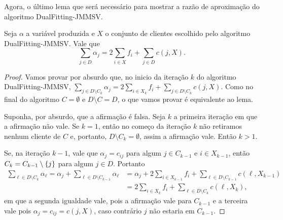 Agora, o último lema que será necessário para mostrar a razão de aproximação do algoritmo {\sc DualFitting-JMMSV}.

\begin{lemma}
\label{greedy:5}
Seja $\alpha$ a variável produzida e $X$ o conjunto de clientes escolhido pelo algoritmo {\sc DualFitting-JMMSV}. Vale que 
\[ \sum_{j \in D} \alpha_j =  2\sum_{i \in X} f_i + \sum_{j \in D} c(j,X) .
\]
\end{lemma}

\begin{proof}
Vamos provar por absurdo que, no inicio da iteração $k$ do algoritmo {\sc DualFitting-JMMSV}, $\sum_{j \in D \setminus C_k} \alpha_j = 2 \sum_{i \in X_k} f_i + \sum_{j \in D \setminus C_k} c(j,X) $. Como no final do algoritmo $C = \emptyset$ e $D\setminus C = D$, o que vamos provar é equivalente ao lema.

Suponha, por absurdo, que a afirmação é falsa. Seja $k$ a primeira iteração em que a afirmação não vale. Se $k=1$, então no começo da iteração $k$ não retiramos nenhum cliente de $C$ e, portanto, $D\setminus C_k = \emptyset$, assim a afirmação vale. Então $k > 1$.

Se, na iteração $k-1$, vale que $\alpha_j = c_{ij}$ para algum $j \in C_{k-1}$ e $i \in X_{k-1}$, então $C_k = C_{k-1} \setminus \{j\}$ para algum $j \in D$. Portanto 
\begin{subequations}
\begin{align*}
 \sum_{\ell \in D \setminus C_k} \alpha_\ell =  \alpha_j + \sum_{\ell \in D \setminus C_{k-1}} \alpha_\ell  &=  \alpha_j + 2 \sum_{i \in X_{k-1}} f_i +\sum_{\ell \in D\setminus  C_{k-1}}c(\ell,X_{k-1}) \\
 &= 2 \sum_{i \in X_{k}} f_i + \sum_{\ell \in D\setminus C_{k}}c(\ell,X_k) ,
\end{align*}
\end{subequations}
em que a segunda igualdade vale, pois a afirmação vale para $C_{k-1}$ e a terceira vale pois $\alpha_j = c_{ij} = c(j,X)$, caso contrário $j$ não estaria em $C_{k-1}$.


\end{proof}

